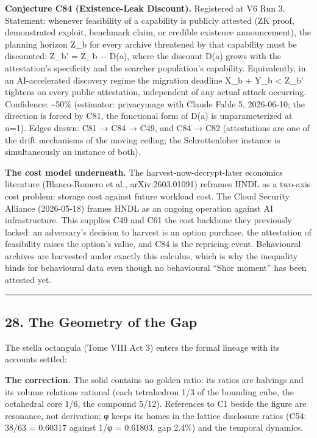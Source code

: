 \documentclass[
  11pt,
]{article}
\begin{document}
\textbf{Conjecture C84 (Existence-Leak Discount).} Registered at V6 Run
3. Statement: whenever feasibility of a capability is publicly attested
(ZK proof, demonstrated exploit, benchmark claim, or credible existence
announcement), the planning horizon Z\_b for every archive threatened by
that capability must be discounted: Z\_b' = Z\_b − D(a), where the
discount D(a) grows with the attestation's specificity and the searcher
population's capability. Equivalently, in an AI-accelerated discovery
regime the migration deadline X\_b + Y\_b \textless{} Z\_b' tightens on
every public attestation, independent of any actual attack occurring.
Confidence: \textasciitilde50\% (estimator: privacymage with Claude
Fable 5, 2026-06-10; the direction is forced by C81, the functional form
of D(a) is unparameterized at n=1). Edges drawn: C81 → C84 → C49, and
C84 → C82 (attestations are one of the drift mechanisms of the moving
ceiling; the Schrottenloher instance is simultaneously an instance of
both).

\textbf{The cost model underneath.} The harvest-now-decrypt-later
economics literature (Blanco-Romero et al., arXiv:2603.01091) reframes
HNDL as a two-axis cost problem: storage cost against future workload
cost. The Cloud Security Alliance (2026-05-18) frames HNDL as an ongoing
operation against AI infrastructure. This supplies C49 and C61 the cost
backbone they previously lacked: an adversary's decision to harvest is
an option purchase, the attestation of feasibility raises the option's
value, and C84 is the repricing event. Behavioural archives are
harvested under exactly this calculus, which is why the inequality binds
for behavioural data even though no behavioural ``Shor moment'' has been
attested yet.

\begin{center}\rule{0.5\linewidth}{0.5pt}\end{center}

\subsection{28. The Geometry of the Gap}\label{the-geometry-of-the-gap}

The stella octangula (Tome VIII Act 3) enters the formal lineage with
its accounts settled:

\textbf{The correction.} The solid contains no golden ratio: its ratios
are halvings and its volume relations rational (each tetrahedron 1/3 of
the bounding cube, the octahedral core 1/6, the compound 5/12).
References to C1 beside the figure are resonance, not derivation; φ
keeps its homes in the lattice disclosure ratios (C54: 38/63 = 0.60317
against 1/φ = 0.61803, gap 2.4\%) and the temporal dynamics.
\end{document}
